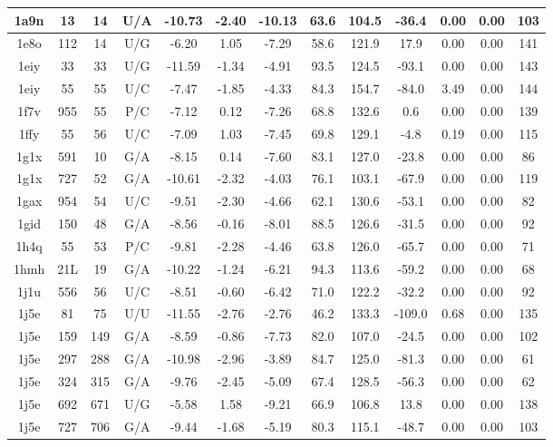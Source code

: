{\begin{center}
\begin{longtable}{|c|c|c|c|c|c|c|c|c|c|c|c|c|}
1a9n & 13 & 14 & U/A & -10.73 & -2.40 & -10.13 & 63.6 & 104.5 & -36.4 & 0.00 & 0.00 & 103 \\ \hline
1e8o & 112 & 14 & U/G & -6.20 & 1.05 & -7.29 & 58.6 & 121.9 & 17.9 & 0.00 & 0.00 & 141 \\ \hline
1eiy & 33 & 33 & U/G & -11.59 & -1.34 & -4.91 & 93.5 & 124.5 & -93.1 & 0.00 & 0.00 & 143 \\ \hline
1eiy & 55 & 55 & U/C & -7.47 & -1.85 & -4.33 & 84.3 & 154.7 & -84.0 & 3.49 & 0.00 & 144 \\ \hline
1f7v & 955 & 55 & P/C & -7.12 & 0.12 & -7.26 & 68.8 & 132.6 & 0.6 & 0.00 & 0.00 & 139 \\ \hline
1ffy & 55 & 56 & U/C & -7.09 & 1.03 & -7.45 & 69.8 & 129.1 & -4.8 & 0.19 & 0.00 & 115 \\ \hline
1g1x & 591 & 10 & G/A & -8.15 & 0.14 & -7.60 & 83.1 & 127.0 & -23.8 & 0.00 & 0.00 & 86 \\ \hline
1g1x & 727 & 52 & G/A & -10.61 & -2.32 & -4.03 & 76.1 & 103.1 & -67.9 & 0.00 & 0.00 & 119 \\ \hline
1gax & 954 & 54 & U/C & -9.51 & -2.30 & -4.66 & 62.1 & 130.6 & -53.1 & 0.00 & 0.00 & 82 \\ \hline
1gid & 150 & 48 & G/A & -8.56 & -0.16 & -8.01 & 88.5 & 126.6 & -31.5 & 0.00 & 0.00 & 92 \\ \hline
1h4q & 55 & 53 & P/C & -9.81 & -2.28 & -4.46 & 63.8 & 126.0 & -65.7 & 0.00 & 0.00 & 71 \\ \hline
1hmh & 21L & 19 & G/A & -10.22 & -1.24 & -6.21 & 94.3 & 113.6 & -59.2 & 0.00 & 0.00 & 68 \\ \hline
1j1u & 556 & 56 & U/C & -8.51 & -0.60 & -6.42 & 71.0 & 122.2 & -32.2 & 0.00 & 0.00 & 92 \\ \hline
1j5e & 81 & 75 & U/U & -11.55 & -2.76 & -2.76 & 46.2 & 133.3 & -109.0 & 0.68 & 0.00 & 135 \\ \hline
1j5e & 159 & 149 & G/A & -8.59 & -0.86 & -7.73 & 82.0 & 107.0 & -24.5 & 0.00 & 0.00 & 102 \\ \hline
1j5e & 297 & 288 & G/A & -10.98 & -2.96 & -3.89 & 84.7 & 125.0 & -81.3 & 0.00 & 0.00 & 61 \\ \hline
1j5e & 324 & 315 & G/A & -9.76 & -2.45 & -5.09 & 67.4 & 128.5 & -56.3 & 0.00 & 0.00 & 62 \\ \hline
1j5e & 692 & 671 & U/G & -5.58 & 1.58 & -9.21 & 66.9 & 106.8 & 13.8 & 0.00 & 0.00 & 138 \\ \hline
1j5e & 727 & 706 & G/A & -9.44 & -1.68 & -5.19 & 80.3 & 115.1 & -48.7 & 0.00 & 0.00 & 103 \\ \hline

\end{longtable}
\end{center}}
